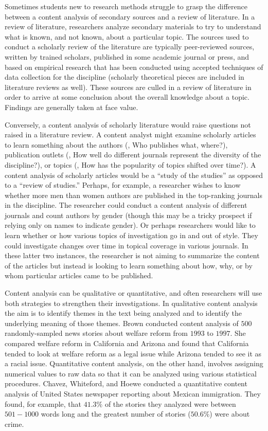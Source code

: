Sometimes students new to research methods struggle to grasp the difference between a content analysis of secondary sources and a review of literature. In a review of literature, researchers analyze secondary materials to try to understand what is known, and not known, about a particular topic. The sources used to conduct a scholarly review of the literature are typically peer-reviewed sources, written by trained scholars, published in some academic journal or press, and based on empirical research that has been conducted using accepted techniques of data collection for the discipline (scholarly theoretical pieces are included in literature reviews as well). These sources are culled in a review of literature in order to arrive at some conclusion about the overall knowledge about a topic. Findings are generally taken at face value.

Conversely, a content analysis of scholarly literature would raise questions not raised in a literature review. A content analyst might examine scholarly articles to learn something about the authors (\eg, Who publishes what, where?), publication outlets (\eg, How well do different journals represent the diversity of the discipline?), or topics (\eg, How has the popularity of topics shifted over time?). A content analysis of scholarly articles would be a ``study of the studies'' as opposed to a ``review of studies.'' Perhaps, for example, a researcher wishes to know whether more men than women authors are published in the top-ranking journals in the discipline. The researcher could conduct a content analysis of different journals and count authors by gender (though this may be a tricky prospect if relying only on names to indicate gender). Or perhaps researchers would like to learn whether or how various topics of investigation go in and out of style. They could investigate changes over time in topical coverage in various journals. In these latter two instances, the researcher is not aiming to summarize the content of the articles but instead is looking to learn something about how, why, or by whom particular articles came to be published.

Content analysis can be qualitative or quantitative, and often researchers will use both strategies to strengthen their investigations. In qualitative content analysis the aim is to identify themes in the text being analyzed and to identify the underlying meaning of those themes. Brown\cite{brown2013race} conducted content analysis of $ 500 $ randomly-sampled news stories about welfare reform from $ 1993 $ to $ 1997 $. She compared welfare reform in California and Arizona and found that California tended to look at welfare reform as a legal issue while Arizona tended to see it as a racial issue. Quantitative content analysis, on the other hand, involves assigning numerical values to raw data so that it can be analyzed using various statistical procedures. Chavez, Whiteford, and Hoewe\cite{chavez2010reporting} conducted a quantitative content analysis of United States newspaper reporting about Mexican immigration. They found, for example, that $ 41.3\% $ of the stories they analyzed were between $ 501-1000 $ words long and the greatest number of stories ($ 50.6\% $) were about crime.

